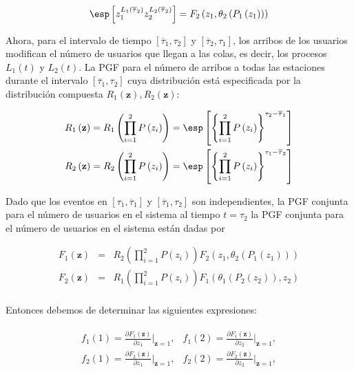 \begin{equation}\label{Eq.PGF.Conjunta.Tau2}
\esp\left[z_{1}^{L_{1}\left(\overline{\tau}_{2}\right)}z_{2}^{L_{2}\left(\overline{\tau}_{2}\right)}\right]=F_{2}\left(z_{1},\theta_{2}\left(P_{1}\left(z_{1}\right)\right)\right)
\end{equation}%

Ahora, para el intervalo de tiempo
$\left[\overline{\tau}_{1},\tau_{2}\right]$ y
$\left[\overline{\tau}_{2},\tau_{1}\right]$, los arribos de los
usuarios modifican el n\'umero de usuarios que llegan a las colas,
es decir, los procesos
$L_{1}\left(t\right)$
y $L_{2}\left(t\right)$. La PGF para el n\'umero de arribos
a todas las estaciones durante el intervalo
$\left[\overline{\tau}_{1},\tau_{2}\right]$  cuya distribuci\'on
est\'a especificada por la distribuci\'on compuesta
$R_{1}\left(\mathbf{z}\right),R_{2}\left(\mathbf{z}\right)$:

\begin{eqnarray*}
R_{1}\left(\mathbf{z}\right)=R_{1}\left(\prod_{i=1}^{2}P\left(z_{i}\right)\right)=\esp\left[\left\{\prod_{i=1}^{2}P\left(z_{i}\right)\right\}^{\tau_{2}-\overline{\tau}_{1}}\right]\\
R_{2}\left(\mathbf{z}\right)=R_{2}\left(\prod_{i=1}^{2}P\left(z_{i}\right)\right)=\esp\left[\left\{\prod_{i=1}^{2}P\left(z_{i}\right)\right\}^{\tau_{1}-\overline{\tau}_{2}}\right]\\
\end{eqnarray*}


Dado que los eventos en
$\left[\tau_{1},\overline{\tau}_{1}\right]$ y
$\left[\overline{\tau}_{1},\tau_{2}\right]$ son independientes, la
PGF conjunta para el n\'umero de usuarios en el sistema al tiempo
$t=\tau_{2}$ la PGF conjunta para el n\'umero de usuarios en el sistema est\'an dadas por

{\footnotesize{
\begin{eqnarray*}
F_{1}\left(\mathbf{z}\right)&=&R_{2}\left(\prod_{i=1}^{2}P\left(z_{i}\right)\right)F_{2}\left(z_{1},\theta_{2}\left(P_{1}\left(z_{1}\right)\right)\right)\\
F_{2}\left(\mathbf{z}\right)&=&R_{1}\left(\prod_{i=1}^{2}P\left(z_{i}\right)\right)F_{1}\left(\theta_{1}\left(P_{2}\left(z_{2}\right)\right),z_{2}\right)\\
\end{eqnarray*}}}


Entonces debemos de determinar las siguientes expresiones:


\begin{eqnarray*}
\begin{array}{cc}
f_{1}\left(1\right)=\frac{\partial F_{1}\left(\mathbf{z}\right)}{\partial z_{1}}|_{\mathbf{z}=1}, & f_{1}\left(2\right)=\frac{\partial F_{1}\left(\mathbf{z}\right)}{\partial z_{2}}|_{\mathbf{z}=1},\\
f_{2}\left(1\right)=\frac{\partial F_{2}\left(\mathbf{z}\right)}{\partial z_{1}}|_{\mathbf{z}=1}, & f_{2}\left(2\right)=\frac{\partial F_{2}\left(\mathbf{z}\right)}{\partial z_{2}}|_{\mathbf{z}=1},\\
\end{array}
\end{eqnarray*}


